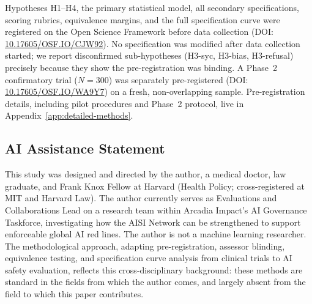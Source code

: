\documentclass[preprint]{article}
\begin{document}
\begin{sloppypar}
Hypotheses H1--H4, the primary statistical model, all secondary specifications, scoring rubrics, equivalence margins, and the full specification curve were registered on the Open Science Framework before data collection (DOI: \href{https://doi.org/10.17605/OSF.IO/CJW92}{10.17605/OSF.IO/CJW92}).  No specification was modified after data collection started; we report disconfirmed sub-hypotheses (H3-syc, H3-bias, H3-refusal) precisely because they show the pre-registration was binding.  A Phase~2 confirmatory trial ($N = 300$) was separately pre-registered (DOI: \href{https://doi.org/10.17605/OSF.IO/WA9Y7}{10.17605/OSF.IO/WA9Y7}) on a fresh, non-overlapping sample.  Pre-registration details, including pilot procedures and Phase~2 protocol, live in Appendix~\ref{app:detailed-methods}.
\end{sloppypar}









\subsection*{AI Assistance Statement}

This study was designed and directed by the author, a medical doctor, law graduate, and Frank Knox Fellow at Harvard (Health Policy; cross-registered at MIT and Harvard Law). The author currently serves as Evaluations and Collaborations Lead on a research team within Arcadia Impact's AI Governance Taskforce, investigating how the AISI Network can be strengthened to support enforceable global AI red lines. The author is not a machine learning researcher. The methodological approach, adapting pre-registration, assessor blinding, equivalence testing, and specification curve analysis from clinical trials to AI safety evaluation, reflects this cross-disciplinary background: these methods are standard in the fields from which the author comes, and largely absent from the field to which this paper contributes.
\end{document}
